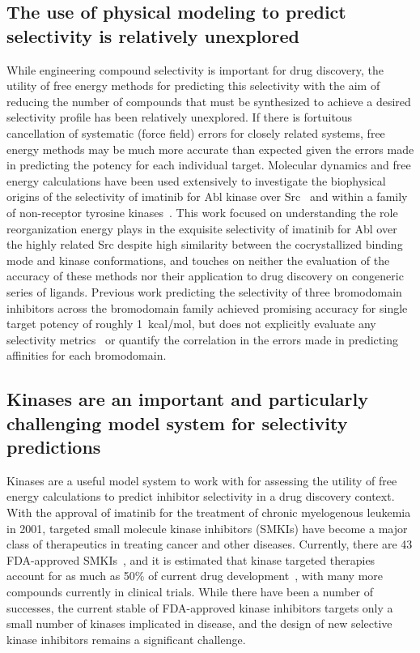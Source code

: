 \documentclass[phd,tocprelim]{cornell}
\begin{document}
\subsection{The use of physical modeling to predict selectivity is relatively unexplored}
While engineering compound selectivity is important for drug discovery, the utility of free energy methods for predicting this selectivity with the aim of reducing the number of compounds that must be synthesized to achieve a desired selectivity profile has been relatively unexplored. 
If there is fortuitous cancellation of systematic (force field) errors for closely related systems, free energy methods may be much more accurate than expected given the errors made in predicting the potency for each individual target. 
Molecular dynamics and free energy calculations have been used extensively to investigate the biophysical origins of the selectivity of imatinib for Abl kinase over Src~\citep{Lin2013-ft,Lin2014-iv} and within a family of non-receptor tyrosine kinases~\citep{Lin2013-mu}. This work focused on understanding the role reorganization energy plays in the exquisite selectivity of imatinib for Abl over the highly related Src despite high similarity between the cocrystallized binding mode and kinase conformations, and touches on neither the evaluation of the accuracy of these methods nor their application to drug discovery on congeneric series of ligands. 
Previous work predicting the selectivity of three bromodomain inhibitors across the bromodomain family achieved promising accuracy for single target potency of roughly 1~kcal/mol, but does not explicitly evaluate any selectivity metrics~\citep{Aldeghi2017-ox} or quantify the correlation in the errors made in predicting affinities for each bromodomain.


\subsection{Kinases are an important and particularly challenging model system for selectivity predictions}
Kinases are a useful model system to work with for assessing the utility of free energy calculations to predict inhibitor selectivity in a drug discovery context. 
With the approval of imatinib for the treatment of chronic myelogenous leukemia in 2001, targeted small molecule kinase inhibitors (SMKIs) have become a major class of therapeutics in treating cancer and other diseases. 
Currently, there are 43 FDA-approved SMKIs~\citep{fda-approved-kinase-inhibitors}, and it is estimated that kinase targeted therapies account for as much as 50\% of current drug development~\citep{Santos:Nat.Rev.DrugDiscov.:2016}, with many more compounds currently in clinical trials. 
While there have been a number of successes, the current stable of FDA-approved kinase inhibitors targets only a small number of kinases implicated in disease, and the design of new selective kinase inhibitors remains a significant challenge.
\end{document}
